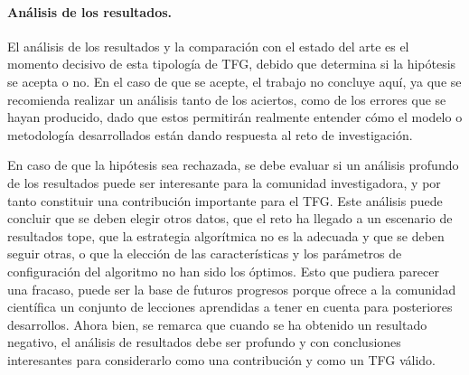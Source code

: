 \paragraph{Análisis de los resultados.} El análisis de los resultados y la comparación con el estado del arte es el momento decisivo de esta tipología de TFG, debido que determina si la hipótesis se acepta o no. En el caso de que se acepte, el trabajo no concluye aquí, ya que se recomienda realizar un análisis tanto de los aciertos, como de los errores que se hayan producido, dado que estos permitirán realmente entender cómo el modelo o metodología desarrollados están dando respuesta al reto de investigación.

En caso de que la hipótesis sea rechazada, se debe evaluar si un análisis profundo de los resultados puede ser interesante para la comunidad investigadora, y por tanto constituir una contribución importante para el TFG. Este análisis puede concluir que se deben elegir otros datos, que el reto ha llegado a un escenario de resultados tope, que la estrategia algorítmica no es la adecuada y que se deben seguir otras, o que la elección de las características y los parámetros de configuración del algoritmo no han sido los óptimos. Esto que pudiera parecer una fracaso, puede ser la base de futuros progresos porque ofrece a la comunidad científica un conjunto de lecciones aprendidas a tener en cuenta para posteriores desarrollos. Ahora bien, se remarca que cuando se ha obtenido un resultado negativo, el análisis de resultados debe ser profundo y con conclusiones interesantes para considerarlo como una contribución y como un TFG válido.

